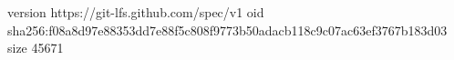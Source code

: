 version https://git-lfs.github.com/spec/v1
oid sha256:f08a8d97e88353dd7e88f5c808f9773b50adacb118c9c07ac63ef3767b183d03
size 45671
